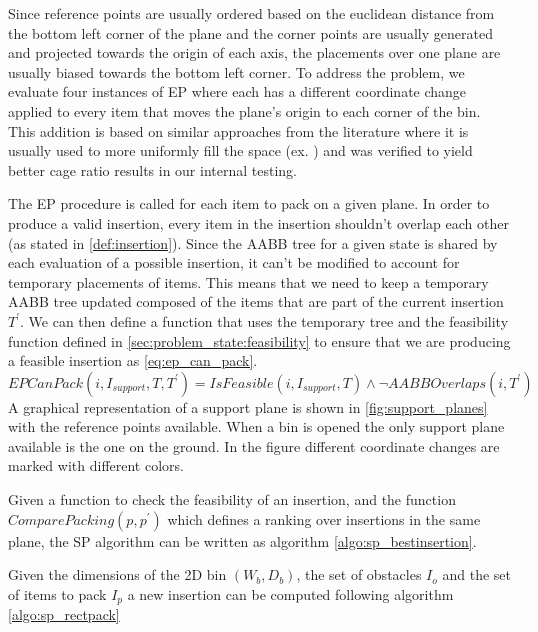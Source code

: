 Since reference points are usually ordered based on the euclidean distance from the bottom left corner of the plane and the corner points are usually generated and projected towards the origin of each axis, the placements over one plane are usually biased towards the bottom left corner.
To address the problem, we evaluate four instances of EP where each has a different coordinate change applied to every item that moves the plane's origin to each corner of the bin.
This addition is based on similar approaches from the literature where it is usually used to more uniformly fill the space (ex. \citeauthor{GAJDA2022102559}) and was verified to yield better cage ratio results in our internal testing.

The EP procedure is called for each item to pack on a given plane. 
In order to produce a valid insertion, every item in the insertion shouldn't overlap each other (as stated in \cref{def:insertion}).
Since the AABB tree for a given state is shared by each evaluation of a possible insertion, it can't be modified to account for temporary placements of items.
This means that we need to keep a temporary AABB tree updated composed of the items that are part of the current insertion $T^\prime$.
We can then define a function that uses the temporary tree and the feasibility function defined in \cref{sec:problem_state:feasibility} to ensure that we are producing a feasible insertion as \cref{eq:ep_can_pack}.
\begin{equation}
    \label{eq:ep_can_pack}
    EPCanPack(i, I_{support}, T, T^\prime) = IsFeasible(i, I_{support}, T) \land \lnot AABBOverlaps(i, T^\prime)
\end{equation}
A graphical representation of a support plane is shown in \cref{fig:support_planes} with the reference points available.
When a bin is opened the only support plane available is the one on the ground. 
In the figure different coordinate changes are marked with different colors.


Given a function to check the feasibility of an insertion,
and the function $ComparePacking(p, p^\prime)$ which defines a ranking over insertions in the same plane,
the SP algorithm can be written as algorithm \ref{algo:sp_bestinsertion}.



Given the dimensions of the 2D bin $(W_b, D_b)$, the set of obstacles $I_{o}$ and the set of items to pack $I_{p}$ a new insertion can be computed following algorithm \ref{algo:sp_rectpack}

